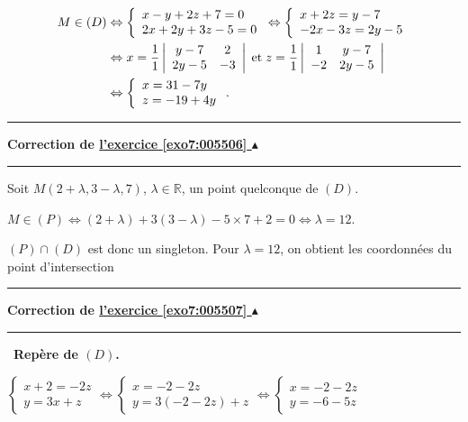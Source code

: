 \documentclass[11pt,a4paper]{article}
\newcommand{\Rr}{\mathbb{R}} \newcommand{\R}{\mathbb{R}}
\newcounter{exo}
\newcommand{\correction}[1]{\hypertarget{cor7:#1}{}\label{cor7:#1}{\bf Correction de \hyperlink{exo7:#1}{l'exercice \ref{exo7:#1} $\blacktriangle$}}\vspace{1mm}\hrule\vspace{1mm}}
\newcommand{\fincorrection}{\vspace{1mm}\hrule\vspace*{7mm}}
\begin{document}
\begin{align*}\ensuremath
M\in(D)&\Leftrightarrow\left\{
\begin{array}{l}
x-y+2z+7=0\\
2x+2y+3z-5=0
\end{array}
\right.\Leftrightarrow\left\{
\begin{array}{l}
x+2z=y-7\\
-2x-3z=2y-5
\end{array}
\right.\\
 &\Leftrightarrow x=\frac{1}{1}\left|
\begin{array}{cc}
y-7&2\\
2y-5&-3
\end{array}
\right|\;\text{et}\;z=\frac{1}{1}\left|
\begin{array}{cc}
1&y-7\\
-2&2y-5
\end{array}
\right|\\
 &\Leftrightarrow\left\{\begin{array}{l}
 x=31-7y\\
 z=-19+4y
 \end{array}\right..
\end{align*}

\begin{center}
\end{center}
\fincorrection
\correction{005506}
Soit $M(2+\lambda,3-\lambda,7)$, $\lambda\in\Rr$, un point quelconque de $(D)$.

\begin{center}
$M\in(P)\Leftrightarrow(2+\lambda)+3(3-\lambda)-5\times7+2=0\Leftrightarrow \lambda=12$.
\end{center}
$(P)\cap(D)$ est donc un singleton. Pour $\lambda=12$, on obtient les coordonnées du point d'intersection

\begin{center}
\end{center}
\fincorrection
\correction{005507}
\textbullet~\textbf{Repère de $(D)$.}

\begin{center}
$\left\{
\begin{array}{l}
x+2=-2z\\
y=3x+z
\end{array}
\right.\Leftrightarrow\left\{
\begin{array}{l}
x=-2-2z\\
y=3(-2-2z)+z
\end{array}
\right.\Leftrightarrow\left\{
\begin{array}{l}
x=-2-2z\\
y=-6-5z
\end{array}
\right.$
\end{center}
\end{document}
